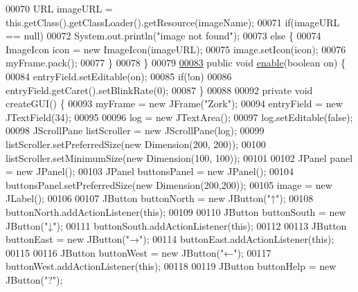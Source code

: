 \begin{DoxyCode}
00070         URL imageURL = this.getClass().getClassLoader().getResource(imageName);
00071         \textcolor{keywordflow}{if}(imageURL == null)
00072             System.out.println(\textcolor{stringliteral}{"image not found"});
00073         \textcolor{keywordflow}{else} \{
00074             ImageIcon icon = \textcolor{keyword}{new} ImageIcon(imageURL);
00075             image.setIcon(icon);
00076             myFrame.pack();
00077         \}
00078     \}
00079 
\hypertarget{UserInterface_8java_source_l00083}{}\hyperlink{classUserInterface_ab9e499c6c847d52c8753f08d62f1adfc}{00083}     \textcolor{keyword}{public} \textcolor{keywordtype}{void} \hyperlink{classUserInterface_ab9e499c6c847d52c8753f08d62f1adfc}{enable}(\textcolor{keywordtype}{boolean} on) \{
00084         entryField.setEditable(on);
00085         \textcolor{keywordflow}{if}(!on)
00086             entryField.getCaret().setBlinkRate(0);
00087     \}
00088 
00092     \textcolor{keyword}{private} \textcolor{keywordtype}{void} createGUI() \{
00093         myFrame = \textcolor{keyword}{new} JFrame(\textcolor{stringliteral}{"Zork"});
00094         entryField = \textcolor{keyword}{new} JTextField(34);
00095 
00096         log = \textcolor{keyword}{new} JTextArea();
00097         log.setEditable(\textcolor{keyword}{false});
00098         JScrollPane listScroller = \textcolor{keyword}{new} JScrollPane(log);
00099         listScroller.setPreferredSize(\textcolor{keyword}{new} Dimension(200, 200));
00100         listScroller.setMinimumSize(\textcolor{keyword}{new} Dimension(100, 100));
00101 
00102         JPanel panel = \textcolor{keyword}{new} JPanel();
00103         JPanel buttonsPanel = \textcolor{keyword}{new} JPanel();
00104         buttonsPanel.setPreferredSize(\textcolor{keyword}{new} Dimension(200,200));
00105         image = \textcolor{keyword}{new} JLabel();
00106 
00107         JButton buttonNorth = \textcolor{keyword}{new} JButton(\textcolor{stringliteral}{"↑"});
00108         buttonNorth.addActionListener(\textcolor{keyword}{this});
00109 
00110         JButton buttonSouth = \textcolor{keyword}{new} JButton(\textcolor{stringliteral}{"↓"});
00111         buttonSouth.addActionListener(\textcolor{keyword}{this});
00112 
00113         JButton buttonEast = \textcolor{keyword}{new} JButton(\textcolor{stringliteral}{"→"});
00114         buttonEast.addActionListener(\textcolor{keyword}{this});
00115 
00116         JButton buttonWest = \textcolor{keyword}{new} JButton(\textcolor{stringliteral}{"←"});
00117         buttonWest.addActionListener(\textcolor{keyword}{this});
00118 
00119         JButton buttonHelp = \textcolor{keyword}{new} JButton(\textcolor{stringliteral}{"?"});

\end{DoxyCode}
